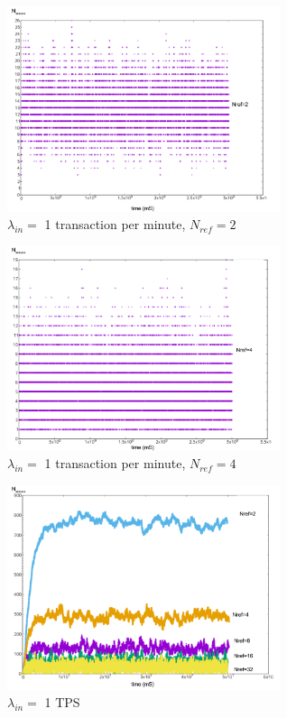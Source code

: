 \documentclass[a4paper,10pt,twocolumn]{article}
\begin{document}
	\begin{appendices}
	\label{Appendix A}
	
	\begin{figure}[H]
		\begin{center}
		\includegraphics[width=80mm]{1min_2.png}
		  \caption{$\lambda_{in}=$ 1 transaction per minute, $N_{ref}=2$}
		\label{fig:min1_2}
		\end{center}
	 \end{figure}
	
	 \begin{figure}[H]
		\begin{center}
			\includegraphics[width=80mm]{1min_4.png}
			\caption{$\lambda_{in}=$ 1 transaction per minute, $N_{ref}=4$}
		  \label{fig:min1_4}
		\end{center}
	 \end{figure}
	
	 \begin{figure}[H]
		\begin{center}
		\includegraphics[width=80mm]{1sec.png}
		  \caption{$\lambda_{in}=$ 1 TPS}
		\label{fig:sec1}
		\end{center}
	 \end{figure}
	

\end{appendices}
\end{document}
